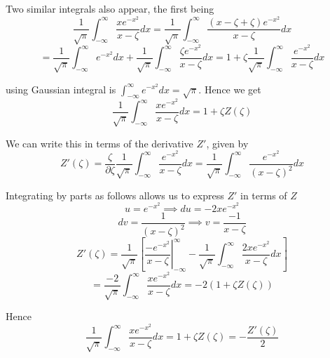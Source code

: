 Two similar integrals also appear, the first being
\begin{equation*}
	\frac{1}{\sqrt{\pi}} \int_{-\infty}^\infty \frac{xe^{-x^2}}{x-\zeta} dx = \frac{1}{\sqrt{\pi}} \int_{-\infty}^\infty \frac{\left( x - \zeta + \zeta \right)e^{-x^2}}{x-\zeta} dx
\end{equation*}
\begin{equation}
	= \frac{1}{\sqrt{\pi}} \int_{-\infty}^\infty e^{-x^2} dx + \frac{1}{\sqrt{\pi}} \int_{-\infty}^\infty \frac{\zeta e^{-x^2}}{x-\zeta} dx = 1 + \zeta \frac{1}{\sqrt{\pi}} \int_{-\infty}^\infty \frac{e^{-x^2}}{x-\zeta} dx
\end{equation}

using Gaussian integral is $\int_{-\infty}^\infty e^{-x^2} dx=\sqrt{\pi}$. Hence we get
\begin{equation}
	\frac{1}{\sqrt{\pi}} \int_{-\infty}^\infty \frac{xe^{-x^2}}{x-\zeta} dx = 1 + \zeta Z \left( \zeta \right)
\end{equation}

We can write this in terms of the derivative $Z'$, given by
\begin{equation}
	Z' \left( \zeta \right) = \frac{\zeta}{\partial \zeta} \frac{1}{\sqrt{\pi}} \int_{-\infty}^\infty \frac{e^{-x^2}}{x-\zeta} dx = \frac{1}{\sqrt{\pi}} \int_{-\infty}^\infty \frac{e^{-x^2}}{\left( x-\zeta \right)^2} dx
\end{equation}

Integrating by parts as follows allows us to express $Z'$ in terms of $Z$
\begin{equation*}
	u = e^{-x^2} \implies du = -2x e^{-x^2}
\end{equation*}
\begin{equation*}
	dv = \frac{1}{\left( x - \zeta \right)^2} \implies v = \frac{-1}{x - \zeta}
\end{equation*}
\begin{equation*}
	Z' \left( \zeta \right) = \frac{1}{\sqrt{\pi}} \left[ \left. \frac{-e^{-x^2}}{x - \zeta} \right|_{-\infty}^\infty  - \frac{1}{\sqrt{\pi}} \int_{-\infty}^\infty \frac{2x e^{-x^2}}{x - \zeta} dx \right]
\end{equation*}
\begin{equation}
	= \frac{-2}{\sqrt{\pi}} \int_{-\infty}^\infty \frac{xe^{-x^2}}{x-\zeta} dx = -2 \left( 1 + \zeta Z \left( \zeta \right) \right)
\end{equation}

Hence
\begin{equation}\label{plasma_dispersion_x_int}
	\frac{1}{\sqrt{\pi}} \int_{-\infty}^\infty \frac{xe^{-x^2}}{x-\zeta} dx = 1 + \zeta Z \left( \zeta \right) = -\frac{Z' \left( \zeta \right)}{2}
\end{equation}

